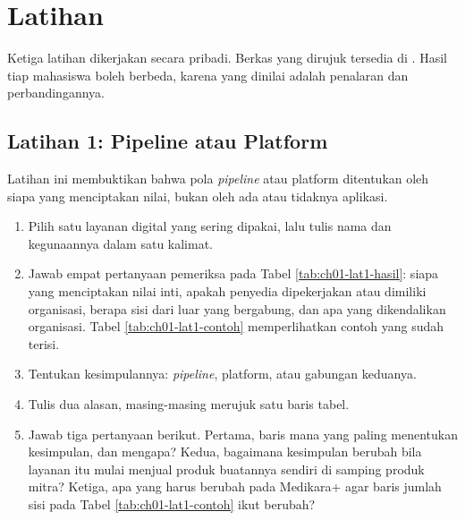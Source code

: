 \section{Latihan}

Ketiga latihan dikerjakan secara pribadi. Berkas yang dirujuk tersedia di
. Hasil tiap mahasiswa boleh berbeda, karena yang
dinilai adalah penalaran dan perbandingannya.

\subsection*{Latihan 1: Pipeline atau Platform}

Latihan ini membuktikan bahwa pola \textit{pipeline} atau platform ditentukan
oleh siapa yang menciptakan nilai, bukan oleh ada atau tidaknya aplikasi.

\begin{enumerate}
  \item Pilih satu layanan digital yang sering dipakai, lalu tulis nama dan
        kegunaannya dalam satu kalimat.
  \item Jawab empat pertanyaan pemeriksa pada Tabel \ref{tab:ch01-lat1-hasil}:
        siapa yang menciptakan nilai inti, apakah penyedia dipekerjakan atau
        dimiliki organisasi, berapa sisi dari luar yang bergabung, dan apa yang
        dikendalikan organisasi. Tabel \ref{tab:ch01-lat1-contoh}
        memperlihatkan contoh yang sudah terisi.
  \item Tentukan kesimpulannya: \textit{pipeline}, platform, atau gabungan
        keduanya.
  \item Tulis dua alasan, masing-masing merujuk satu baris tabel.
  \item Jawab tiga pertanyaan berikut. Pertama, baris mana yang paling
        menentukan kesimpulan, dan mengapa? Kedua, bagaimana kesimpulan berubah
        bila layanan itu mulai menjual produk buatannya sendiri di samping produk
        mitra? Ketiga, apa yang harus berubah pada Medikara+ agar baris jumlah
        sisi pada Tabel \ref{tab:ch01-lat1-contoh} ikut berubah?
\end{enumerate}

